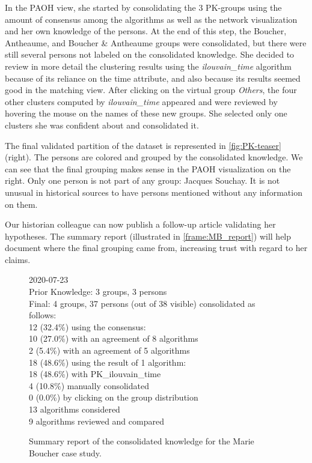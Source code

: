 In the PAOH view, she started by consolidating the 3 PK-groups using the amount of consensus among the algorithms as well as the network visualization and her own knowledge of the persons. At the end of this step, the Boucher, Antheaume, and Boucher \& Antheaume groups were consolidated, but there were still several persons not labeled on the consolidated knowledge. She decided to review in more detail the clustering results using the \emph{ilouvain\_time} algorithm because of its reliance on the time attribute, and also because its results seemed good in the matching view. After clicking on the virtual group \emph{Others}, the four other clusters computed by \emph{ilouvain\_time} appeared and were reviewed by hovering the mouse on the names of these new groups.
She selected only one clusters she was confident about and consolidated it.

The final validated partition of the dataset is represented in \autoref{fig:PK-teaser} (right).
The persons are colored and grouped by the consolidated knowledge. We can see that the final grouping makes sense in the PAOH visualization on the right. Only one person is not part of any group: Jacques Souchay. It is not unusual in historical sources to have persons mentioned without any information on them. %

Our historian colleague can now publish a follow-up article validating her hypotheses. The summary report (illustrated in \autoref{frame:MB_report}) will help document where the final grouping came from, increasing trust with regard to her claims.

\begin{figure}[htbp]
\centering
\begin{mdframed}[userdefinedwidth=\linewidth]
2020-07-23 \\
Prior Knowledge: 3 groups, 3 persons \\
Final: 4 groups, 37 persons (out of 38 visible) consolidated as follows: \\
12 (32.4\%) using the consensus: \\
\hspace*{2em} 10 (27.0\%) with an agreement of 8 algorithms \\
\hspace*{2em} 2 (5.4\%) with an agreement of 5 algorithms \\
18 (48.6\%) using the result of 1 algorithm: \\
\hspace*{2em} 18 (48.6\%) with PK\_ilouvain\_time \\
4 (10.8\%) manually consolidated \\
0 (0.0\%) by clicking on the group distribution \\
13 algorithms considered \\
9 algorithms reviewed and compared
\end{mdframed}
\caption{Summary report of the consolidated knowledge for the Marie Boucher case study.}
    \label{frame:MB_report}
\end{figure}


